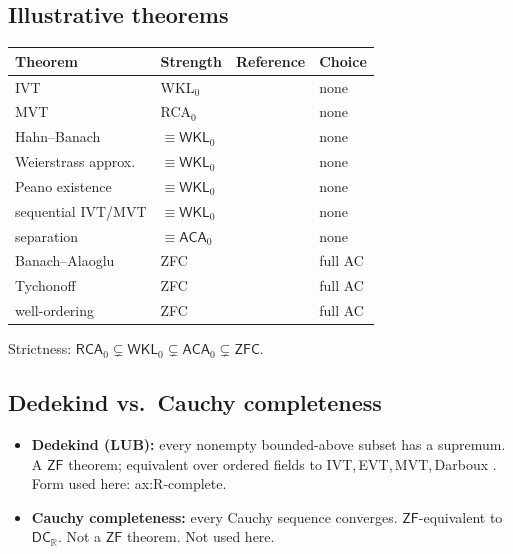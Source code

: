 \documentclass[11pt,reqno]{amsart}
\providecommand{\R}{\mathbb{R}}
\newcommand{\comma}{,\,\allowbreak}
\theoremstyle{redplain}
\begin{document}
\subsection{Illustrative theorems}

\bigskip
\begin{center}\small
	\begin{tabular}{|>{\raggedright\arraybackslash}m{4.5cm}|>{\centering\arraybackslash}m{2.5cm}|>{\centering\arraybackslash}m{3.2cm}|>{\centering\arraybackslash}m{1.3cm}|}
		\hline
		\textbf{Theorem} & \textbf{Strength} & \textbf{Reference} & \textbf{Choice} \\ \hline
		\textsf{IVT} & \textsf{WKL$_0$} & \cite{Simpson2009} & \textsf{none} \\ \hline
		\textsf{MVT} & \textsf{RCA$_0$} & \cite{HardinVelleman2001} & \textsf{none} \\ \hline
		\textsf{Hahn--Banach} & $\equiv\textsf{WKL}_0$ & \cite{Simpson2009} & \textsf{none} \\ \hline
		\textsf{Weierstrass approx.} & $\equiv\textsf{WKL}_0$ & \cite{Simpson2009} & \textsf{none} \\ \hline
		\textsf{Peano existence} & $\equiv\textsf{WKL}_0$ & \cite{Simpson2009} & \textsf{none} \\ \hline
		\textsf{sequential IVT/MVT} & $\equiv\textsf{WKL}_0$ & \cite{Sanders2020} & \textsf{none} \\ \hline
		\textsf{separation} & $\equiv\textsf{ACA}_0$ & \cite{Humphreys2015} & \textsf{none} \\ \hline
		\textsf{Banach--Alaoglu} & \textsf{ZFC} & \cite{Alaoglu1940} & \textsf{full AC} \\ \hline
		\textsf{Tychonoff} & \textsf{ZFC} & \cite{Kelley1950} & \textsf{full AC} \\ \hline
		\textsf{well-ordering} & \textsf{ZFC} & \cite{Jech1973} & \textsf{full AC} \\ \hline
	\end{tabular}
\end{center}
\medskip
\noindent Strictness: $\textsf{RCA}_0\subsetneq\textsf{WKL}_0\subsetneq\textsf{ACA}_0\subsetneq\textsf{ZFC}$.

\subsection{Dedekind vs.\ Cauchy completeness}

\begin{itemize}
	\item \textbf{Dedekind (LUB):} every nonempty bounded-above subset has a supremum. A $\textsf{ZF}$ theorem; equivalent over ordered fields to IVT\comma EVT\comma MVT\comma Darboux \cite{Propp2012,Teismann2013}. Form used here: \textsf{ax:R-complete}.
	\item \textbf{Cauchy completeness:} every Cauchy sequence converges. $\textsf{ZF}$-equivalent to $\textsf{DC}_\R$. Not a $\textsf{ZF}$ theorem. Not used here.
\end{itemize}
\end{document}
